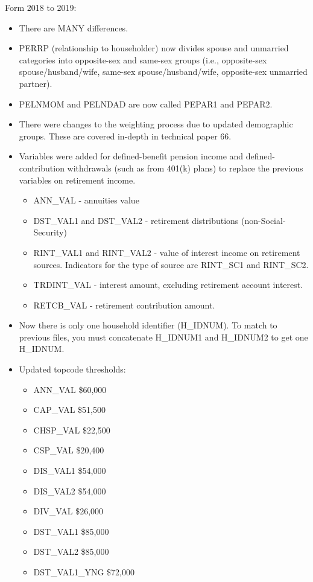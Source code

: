 \documentclass{article}
\begin{document}
Form 2018 to 2019:
\begin{itemize}
	\item There are MANY differences.
	\item PERRP (relationship to householder) now divides spouse and unmarried 
	categories into opposite-sex and same-sex groups (i.e., opposite-sex 
	spouse/husband/wife, same-sex spouse/husband/wife, opposite-sex unmarried partner). 
	\item PELNMOM and PELNDAD are now called PEPAR1 and PEPAR2.
	\item There were changes to the weighting process due to updated demographic groups. These are covered in-depth in technical paper 66.
	\item Variables were added for 
	defined-benefit pension income and defined-contribution withdrawals (such as from 
	401(k) plans) to replace the previous variables on retirement income.
	\begin{itemize}
		\item ANN\_VAL - annuities value
		\item DST\_VAL1 and DST\_VAL2 - retirement distributions (non-Social-Security)
		\item RINT\_VAL1 and RINT\_VAL2 - value of interest income on retirement sources. Indicators for the type of source are RINT\_SC1 and RINT\_SC2.
		\item TRDINT\_VAL - interest amount, excluding retirement account interest.
		\item RETCB\_VAL - retirement contribution amount.
	\end{itemize}
	\item Now there is only one household identifier (H\_IDNUM). To match to previous files, you must concatenate H\_IDNUM1 and H\_IDNUM2 to get one H\_IDNUM.
	\item Updated topcode thresholds:
	\begin{itemize}
	\item ANN\_VAL \$60,000
	\item CAP\_VAL \$51,500
	\item CHSP\_VAL \$22,500 
	\item CSP\_VAL \$20,400
	\item DIS\_VAL1 \$54,000 
	\item DIS\_VAL2 \$54,000
	\item DIV\_VAL \$26,000 
	\item DST\_VAL1 \$85,000
	\item DST\_VAL2 \$85,000
	\item DST\_VAL1\_YNG \$72,000

\end{itemize}
\end{itemize}
\end{document}
